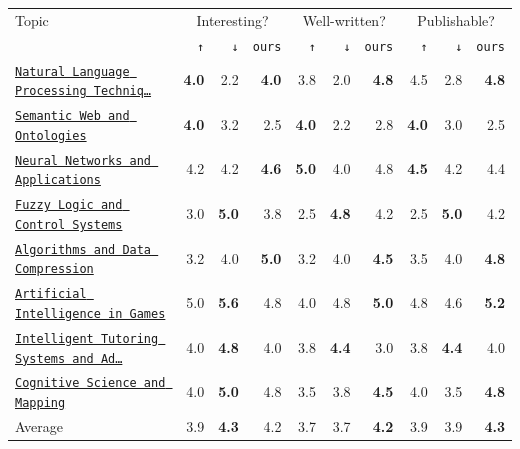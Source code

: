 \begin{tabular}{l|rrr|rrr|rrr}
\toprule
Topic & \multicolumn{3}{c|}{Interesting?} & \multicolumn{3}{c|}{Well-written?} & \multicolumn{3}{c}{Publishable?} \\
 & \texttt{↑} & \texttt{↓} & \texttt{ours} & \texttt{↑} & \texttt{↓} & \texttt{ours} & \texttt{↑} & \texttt{↓} & \texttt{ours} \\
\midrule
\href{https://openalex.org/topics/T10181}{\texttt{Natural Language Processing Techniq…}} & \textbf{4.0} & 2.2 & \textbf{4.0} & 3.8 & 2.0 & \textbf{4.8} & 4.5 & 2.8 & \textbf{4.8} \\
\href{https://openalex.org/topics/T10215}{\texttt{Semantic Web and Ontologies}} & \textbf{4.0} & 3.2 & 2.5 & \textbf{4.0} & 2.2 & 2.8 & \textbf{4.0} & 3.0 & 2.5 \\
\href{https://openalex.org/topics/T10320}{\texttt{Neural Networks and Applications}} & 4.2 & 4.2 & \textbf{4.6} & \textbf{5.0} & 4.0 & 4.8 & \textbf{4.5} & 4.2 & 4.4 \\
\href{https://openalex.org/topics/T10820}{\texttt{Fuzzy Logic and Control Systems}} & 3.0 & \textbf{5.0} & 3.8 & 2.5 & \textbf{4.8} & 4.2 & 2.5 & \textbf{5.0} & 4.2 \\
\href{https://openalex.org/topics/T11269}{\texttt{Algorithms and Data Compression}} & 3.2 & 4.0 & \textbf{5.0} & 3.2 & 4.0 & \textbf{4.5} & 3.5 & 4.0 & \textbf{4.8} \\
\href{https://openalex.org/topics/T11574}{\texttt{Artificial Intelligence in Games}} & 5.0 & \textbf{5.6} & 4.8 & 4.0 & 4.8 & \textbf{5.0} & 4.8 & 4.6 & \textbf{5.2} \\
\href{https://openalex.org/topics/T11902}{\texttt{Intelligent Tutoring Systems and Ad…}} & 4.0 & \textbf{4.8} & 4.0 & 3.8 & \textbf{4.4} & 3.0 & 3.8 & \textbf{4.4} & 4.0 \\
\href{https://openalex.org/topics/T12805}{\texttt{Cognitive Science and Mapping}} & 4.0 & \textbf{5.0} & 4.8 & 3.5 & 3.8 & \textbf{4.5} & 4.0 & 3.5 & \textbf{4.8} \\
\midrule
Average & 3.9 & \textbf{4.3} & 4.2 & 3.7 & 3.7 & \textbf{4.2} & 3.9 & 3.9 & \textbf{4.3} \\
\bottomrule
\end{tabular}